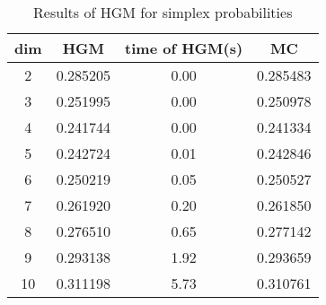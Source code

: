 \begin{table}[htbp]
\begin{center}
\begin{tabular}{cccc}
dim& HGM & time of HGM(s) & MC\\
\hline
2 & 0.285205 & 0.00 & 0.285483\\
3 & 0.251995 & 0.00 & 0.250978\\
4 & 0.241744 & 0.00 & 0.241334\\
5 & 0.242724 & 0.01 & 0.242846\\
6 & 0.250219 & 0.05 & 0.250527\\
7 & 0.261920 & 0.20 & 0.261850\\
8 & 0.276510 & 0.65 & 0.277142\\
9 & 0.293138 & 1.92 & 0.293659\\
10 & 0.311198 & 5.73 & 0.310761\\
\hline
\end{tabular}
\end{center}
\caption{Results of HGM for simplex probabilities}
\label{tab1}
\end{table}
